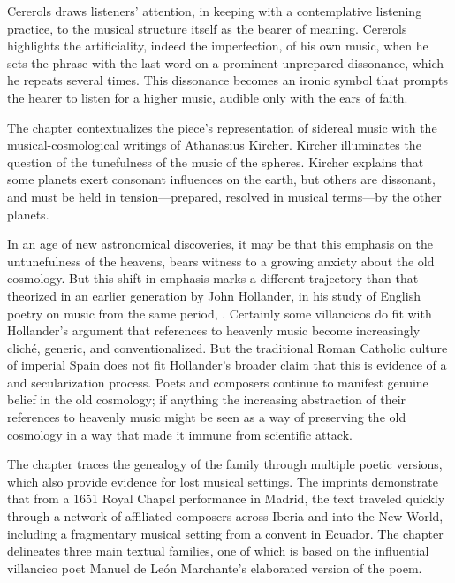 \documentclass{vcbook-proposal}
\begin{document}
Cererols draws listeners' attention, in keeping with a contemplative listening practice, to the musical structure itself as the bearer of meaning.
Cererols highlights the artificiality, indeed the imperfection, of his own music, when he sets the phrase  with the last word on a prominent unprepared dissonance, which he repeats several times.
This dissonance becomes an ironic symbol that prompts the hearer to listen for a higher music, audible only with the ears of faith.

The chapter contextualizes the piece's representation of sidereal music with the musical-cosmological writings of Athanasius Kircher.
Kircher illuminates the question of the tunefulness of the music of the spheres.
Kircher explains that some planets exert consonant influences on the earth, but others are dissonant, and must be held in tension---prepared, resolved in musical terms---by the other planets. 

In an age of new astronomical discoveries, it may be that this emphasis on the untunefulness of the heavens, bears witness to a growing anxiety about the old cosmology.
But this shift in emphasis marks a different trajectory than that theorized in an earlier generation by John Hollander, in his study of English poetry on music from the same period, .
Certainly some villancicos do fit with Hollander's argument that references to heavenly music become increasingly cliché, generic, and conventionalized.
But the traditional Roman Catholic culture of imperial Spain does not fit Hollander's broader claim that this is evidence of a  and secularization process.
Poets and composers continue to manifest genuine belief in the old cosmology; if anything the increasing abstraction of their references to heavenly music might be seen as a way of preserving the old cosmology in a way that made it immune from scientific attack.

The chapter traces the genealogy of the  family through multiple poetic versions, which also provide evidence for lost musical settings.
The imprints demonstrate that from a 1651 Royal Chapel performance in Madrid, the text traveled quickly through a network of affiliated composers across Iberia and into the New World, including a fragmentary musical setting from a convent in Ecuador.
The chapter delineates three main textual families, one of which is based on the influential villancico poet Manuel de León Marchante's elaborated version of the poem. 
\end{document}

